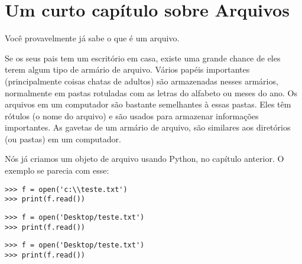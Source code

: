 

\chapter{Um curto capítulo sobre Arquivos}\label{ch:ashortchapteraboutfiles}

Você provavelmente já sabe o que é um arquivo.
\par
\noindent
Se os seus pais tem um escritório em casa, existe uma grande chance de eles terem algum tipo de armário de arquivo. Vários papéis importantes (principalmente coisas chatas de adultos) são armazenadas nesses armários, normalmente em pastas rotuladas com as letras do alfabeto ou meses do ano. Os arquivos em um computador são bastante semelhantes à essas pastas. Eles têm rótulos (o nome do arquivo) e são usados para armazenar informações importantes. As gavetas de um armário de arquivo, são similares aos diretórios (ou pastas) em um computador.
\par
Nós já criamos um objeto de arquivo usando Python, no capítulo anterior. O exemplo se parecia com esse:

\begin{WINDOWS}

\begin{listing}
\begin{verbatim}
>>> f = open('c:\\teste.txt')
>>> print(f.read())
\end{verbatim}
\end{listing}

\end{WINDOWS}

\begin{MAC}

\begin{listing}
\begin{verbatim}
>>> f = open('Desktop/teste.txt')
>>> print(f.read())
\end{verbatim}
\end{listing}

\end{MAC}

\begin{LINUX}

\begin{listing}
\begin{verbatim}
>>> f = open('Desktop/teste.txt')
>>> print(f.read())
\end{verbatim}
\end{listing}
 
\end{LINUX}

